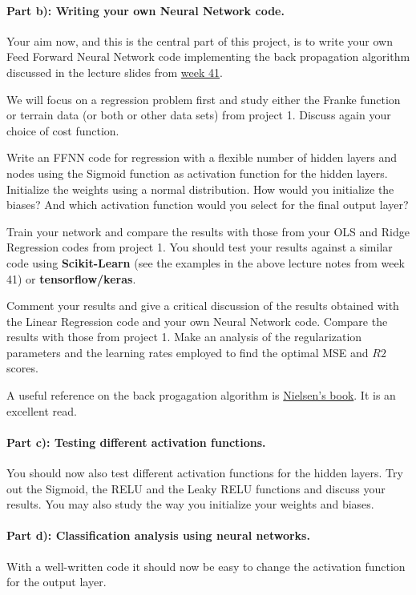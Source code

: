 \documentclass[%
oneside,                 %
final,                   %
10pt]{article}
\begin{document}
\paragraph{Part b): Writing your own Neural Network code.}
Your aim now, and this is the central part of this project, is to
write your own Feed Forward Neural Network  code implementing the back
propagation algorithm discussed in the lecture slides from \href{{https://compphysics.github.io/MachineLearning/doc/pub/week41/html/week41.html}}{week 41}.

We will focus on a regression problem first and study either the
Franke function or terrain data (or both or other data sets) from
project 1.  Discuss again your choice of cost function.

Write an FFNN code for regression with a flexible number of hidden
layers and nodes using the Sigmoid function as activation function for
the hidden layers. Initialize the weights using a normal
distribution. How would you initialize the biases? And which
activation function would you select for the final output layer?

Train your network and compare the results with those from your OLS and Ridge Regression codes from project 1. 
You should test your results against a similar code using \textbf{Scikit-Learn} (see the examples in the above lecture notes from week 41) or \textbf{tensorflow/keras}. 

Comment your results and give a critical discussion of the results
obtained with the Linear  Regression code and your own Neural Network
code.  Compare the results with those from project 1.
Make an analysis of the regularization parameters and the learning rates employed to find the optimal MSE and $R2$ scores.

A useful reference on the back progagation algorithm is \href{{http://neuralnetworksanddeeplearning.com/}}{Nielsen's
book}. It is an excellent
read.



\paragraph{Part c): Testing different activation functions.}
You should now also test different activation functions for the hidden layers. Try out the Sigmoid, the RELU and the Leaky RELU functions and discuss your results. You may also study the way you initialize your weights and biases.

\paragraph{Part d): Classification  analysis using neural networks.}
With a well-written code it should now be easy to change the
activation function for the output layer.
\end{document}
